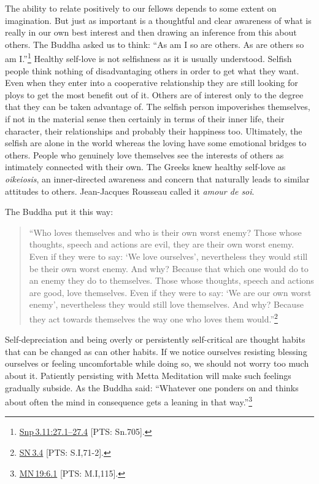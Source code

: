 \documentclass[10pt, openright]{book}
\begin{document}
The ability to relate positively to our fellows depends to some extent on imagination. But just as important is a thoughtful and clear awareness of what is really in our own best interest and then drawing an inference from this about others. The Buddha asked us to think: “As am I so are others. As are others so am I.”\footnote {\href{https://suttacentral.net/snp3.11/en/sujato\#27.1}{Snp 3.11:27.1–27.4} [PTS: Sn.705].} Healthy self-love is not selfishness as it is usually understood. Selfish people think nothing of disadvantaging others in order to get what they want. Even when they enter into a cooperative relationship they are still looking for ploys to get the most benefit out of it. Others are of interest only to the degree that they can be taken advantage of. The selfish person impoverishes themselves, if not in the material sense then certainly in terms of their inner life, their character, their relationships and probably their happiness too. Ultimately, the selfish are alone in the world whereas the loving have some emotional bridges to others. People who genuinely love themselves see the interests of others as intimately connected with their own. The Greeks knew healthy self-love as \textit{oikeiosis}, an inner-directed awareness and concern that naturally leads to similar attitudes to others. Jean-Jacques Rousseau called it \textit{amour de soi}.


The Buddha put it this way:


\begin{quote}

\hspace{-0.4em}“Who loves themselves and who is their own worst enemy? Those whose thoughts, speech and actions are evil, they are their own worst enemy. Even if they were to say: ‘We love ourselves’, nevertheless they would still be their own worst enemy. And why? Because that which one would do to an enemy they do to themselves. Those whose thoughts, speech and actions are good, love themselves. Even if they were to say: ‘We are our own worst enemy’, nevertheless they would still love themselves. And why? Because they act towards themselves the way one who loves them would.”\footnote {\href{https://suttacentral.net/sn3.4/en/sujato}{SN 3.4} [PTS: S.I,71-2].}


\end{quote}
Self-depreciation and being overly or persistently self-critical are thought habits that can be changed as can other habits. If we notice ourselves resisting blessing ourselves or feeling uncomfortable while doing so, we should not worry too much about it. Patiently persisting with Metta Meditation will make such feelings gradually subside. As the Buddha said: “Whatever one ponders on and thinks about often the mind in consequence gets a leaning in that way.”\footnote {\href{https://suttacentral.net/mn19/en/sujato\#6.1}{MN 19:6.1} [PTS: M.I,115].}
\end{document}
